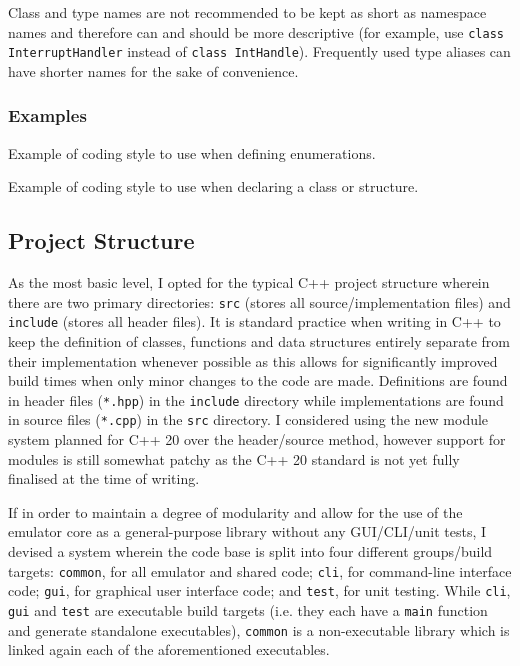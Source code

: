         Class and type names are not recommended to be kept as short as namespace names and therefore can and should be more descriptive (for example, use \texttt{class InterruptHandler} instead of \texttt{class IntHandle}). Frequently used type aliases can have shorter names for the sake of convenience.

    \subsubsection{Examples}
        \begin{listing}[h]
            
            \caption{Example of coding style to use when defining enumerations.}
            \label{lst:enum-example}
        \end{listing}

        \begin{listing}[h]
            
            \caption{Example of coding style to use when declaring a class or structure.}
            \label{lst:class-example}
        \end{listing}

\subsection{Project Structure}
    As the most basic level, I opted for the typical C++ project structure wherein there are two primary directories: \texttt{src} (stores all source/implementation files) and \texttt{include} (stores all header files). It is standard practice when writing in C++ to keep the definition of classes, functions and data structures entirely separate from their implementation whenever possible as this allows for significantly improved build times when only minor changes to the code are made. Definitions are found in header files (\texttt{*.hpp}) in the \texttt{include} directory while implementations are found in source files (\texttt{*.cpp}) in the \texttt{src} directory. I considered using the new module system planned for C++ 20 over the header/source method, however support for modules is still somewhat patchy as the C++ 20 standard is not yet fully finalised at the time of writing.

    If in order to maintain a degree of modularity and allow for the use of the emulator core as a general-purpose library without any GUI/CLI/unit tests, I devised a system wherein the code base is split into four different groups/build targets: \texttt{common}, for all emulator and shared code; \texttt{cli}, for command-line interface code; \texttt{gui}, for graphical user interface code; and \texttt{test}, for unit testing. While \texttt{cli}, \texttt{gui} and \texttt{test} are executable build targets (i.e. they each have a \texttt{main} function and generate standalone executables), \texttt{common} is a non-executable library which is linked again each of the aforementioned executables.

